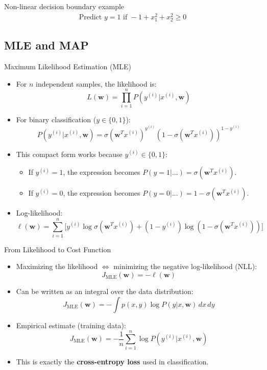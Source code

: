 \documentclass[serif, aspectratio=169]{beamer}
\begin{document}
\begin{frame}{Non-linear decision boundary example}
    \begin{align*}
        \text{Predict } y=1 \text{ if } -1 + x_1^2 + x_2^2 \geq 0
    \end{align*}
    
\end{frame}
\subsection{MLE and MAP}

\begin{frame}{Maximum Likelihood Estimation (MLE)}
    \begin{itemize}
        \item For $n$ independent samples, the likelihood is:
        \[
            L(\mathbf{w}) = \prod_{i=1}^{n} P(y^{(i)}|x^{(i)}, \mathbf{w})
        \]
        \item For binary classification ($y \in \{0,1\}$):
        \[
            P(y^{(i)}|x^{(i)},\mathbf{w}) = \sigma (\mathbf{w}^Tx^{(i)})^{y^{(i)}} (1 - \sigma (\mathbf{w}^Tx^{(i)}))^{1 - y^{(i)}}
        \]
        \item This compact form works because $y^{(i)} \in \{0, 1\}$:
        \begin{itemize}
            \item If $y^{(i)}=1$, the expression becomes $P(y=1|...) = \sigma (\mathbf{w}^Tx^{(i)})$.
            \item If $y^{(i)}=0$, the expression becomes $P(y=0|...) = 1 - \sigma (\mathbf{w}^Tx^{(i)})$.
        \end{itemize}
        \item Log-likelihood:
        \[
            \ell(\mathbf{w}) = \sum_{i=1}^n \big[ y^{(i)} \log \sigma(\mathbf{w}^Tx^{(i)}) + (1-y^{(i)})\log (1-\sigma(\mathbf{w}^Tx^{(i)})) \big]
        \]
    \end{itemize}
\end{frame}

\begin{frame}{From Likelihood to Cost Function}
    \begin{itemize}
        \item Maximizing the likelihood $\Leftrightarrow$ minimizing the negative log-likelihood (NLL):
        \[
            J_{\text{MLE}}(\mathbf{w}) = -\ell(\mathbf{w})
        \]
        \item Can be written as an integral over the data distribution:
        \[
            J_{\text{MLE}}(\mathbf{w}) = - \int p(x,y) \log P(y|x, \mathbf{w}) \, dx\,dy
        \]
        \item Empirical estimate (training data):
        \[
            J_{\text{MLE}}(\mathbf{w}) = -\frac{1}{n}\sum_{i=1}^{n} \log P(y^{(i)}|x^{(i)}, \mathbf{w})
        \]
        \item This is exactly the \textbf{cross-entropy loss} used in classification.
    \end{itemize}
\end{frame}
\end{document}
